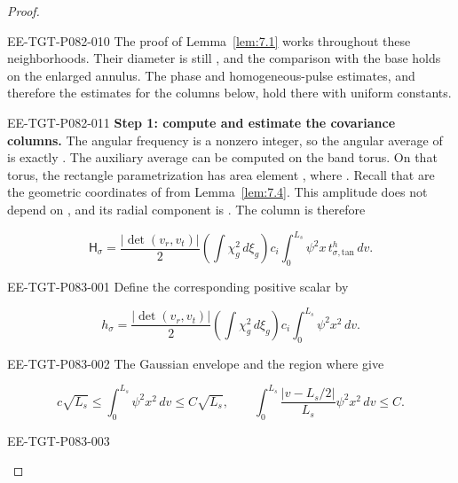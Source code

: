 \begin{proof}
\begin{EESegment}{EE-TGT-P082-010}
The proof of Lemma~\ref{lem:7.1} works throughout these neighborhoods. Their diameter is still , and the comparison with the base holds on the enlarged annulus. The phase and homogeneous-pulse estimates, and therefore the estimates for the columns below, hold there with uniform constants.
\end{EESegment}

\begin{EESegment}{EE-TGT-P082-011}
\textbf{Step 1: compute and estimate the covariance columns.}
The angular frequency  is a nonzero integer, so the angular average of  is exactly . The auxiliary average can be computed on the band torus. On that torus, the rectangle parametrization has area element , where . Recall that  are the geometric coordinates of  from Lemma~\ref{lem:7.4}. This amplitude does not depend on , and its radial component is . The column  is therefore
\end{EESegment}
\begin{equation}
  \mathsf H_\sigma=
  \frac{|\det(v_r,v_t)|}{2}
  \left(\int\chi_g^2\,d\xi_g\right)c_i
  \int_0^{L_s}\psi^2x\,t^h_{\sigma,\mathrm{tan}}\,dv.
  \tag{7.27}\label{eq:7.27}
\end{equation}
%
\begin{EESegment}{EE-TGT-P083-001}
Define the corresponding positive scalar by
\end{EESegment}
\[
  h_\sigma=
  \frac{|\det(v_r,v_t)|}{2}
  \left(\int\chi_g^2\,d\xi_g\right)c_i
  \int_0^{L_s}\psi^2x^2\,dv.
\]
\begin{EESegment}{EE-TGT-P083-002}
The Gaussian envelope and the region where  give
\end{EESegment}
\[
  c\sqrt{L_s}\leq\int_0^{L_s}\psi^2x^2\,dv\leq C\sqrt{L_s},
  \qquad
  \int_0^{L_s}\frac{|v-L_s/2|}{L_s}\psi^2x^2\,dv\leq C.
\]
\begin{EESegment}{EE-TGT-P083-003}

\end{EESegment}
\end{proof}
